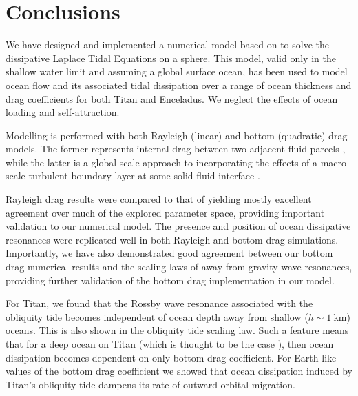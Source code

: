 \section{Conclusions}

We have designed and implemented a numerical model based on \citet{sears1995tidal} to solve the dissipative Laplace Tidal Equations on a sphere. This model, valid only in the shallow water limit and assuming a global surface ocean, has been used to model ocean flow and its associated tidal dissipation over a range of ocean thickness and drag coefficients for both Titan and Enceladus. We neglect the effects of ocean loading and self-attraction.

Modelling is performed with both Rayleigh (linear) and bottom (quadratic) drag models. The former represents internal drag between two adjacent fluid parcels \citep{neumann1968ocean}, while the latter is a global scale approach to incorporating the effects of a macro-scale turbulent boundary layer at some solid-fluid interface \citep{gill1982atmosphere}.

Rayleigh drag results were compared to that of \citet{matsuyama2014tidal} yielding mostly excellent agreement over much of the explored parameter space, providing important validation to our numerical model. The presence and position of ocean dissipative resonances were replicated well in both Rayleigh and bottom drag simulations. Importantly, we have also demonstrated good agreement between our bottom drag numerical results and the scaling laws of \citet{chen2013tidal} away from gravity wave resonances, providing further validation of the bottom drag implementation in our model.

For Titan, we found that the Rossby wave resonance associated with the obliquity tide becomes independent of ocean depth away from shallow ($h \sim\SI{1}{\kilo\metre}$) oceans. This is also shown in the \citet{chen2013tidal} obliquity tide scaling law. Such a feature means that for a deep ocean on Titan (which is thought to be the case \citep{sohl2014structural}), then ocean dissipation becomes dependent on only bottom drag coefficient. For Earth like values of the bottom drag coefficient we showed that ocean dissipation induced by Titan's obliquity tide dampens its rate of outward orbital migration. 


